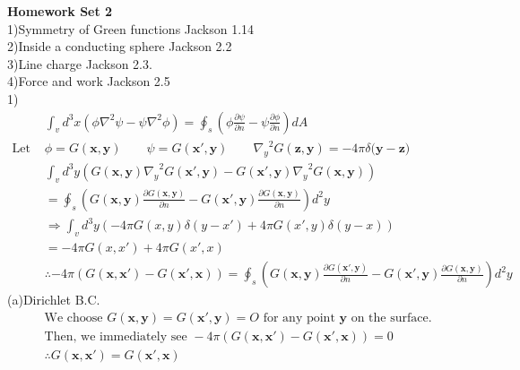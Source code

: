 \documentclass[letterpage]{article}
\begin{document}
  \textbf{Homework Set 2}\\

1)Symmetry of Green functions
Jackson 1.14\\

2)Inside a conducting sphere
Jackson 2.2\\

3)Line charge
Jackson 2.3.\\

4)Force and work
Jackson 2.5\\

1)
\begin{align*}
  &\int_v d^3 x (\phi \nabla^2 \psi-\psi \nabla^2 \phi) = \oint_s 
  \left(\phi \frac{\partial \psi}{\partial n}-\psi 
  \frac{\partial \phi}{\partial n} \right) dA\\
  \text{Let } &\phi = G(\textbf{x}, \textbf{y}) \qquad 
  \psi = G(\textbf{x}',\textbf{y}) \qquad {\nabla_y}^2 G(\textbf{z},\textbf{y})
  = -4\pi\delta (\textbf{y}-\textbf{z)}\\
  &\int_v d^3y \left(G(\textbf{x},\textbf{y}) {\nabla_y}^2 
  G (\textbf{x}',\textbf{y})
  - G(\textbf{x}',\textbf{y}){\nabla_y}^2 G(\textbf{x},\textbf{y})\right)\\
  &= \oint_s \left(G(\textbf{x},\textbf{y}) 
  \frac{\partial G (\textbf{x},\textbf{y})}{\partial n} 
  - G (\textbf{x}',\textbf{y})
  \frac{\partial G (\textbf{x},\textbf{y})}{\partial n} \right)d^2y\\
  &\Rightarrow \int_v d^3y \left(-4\pi G(x,y) \delta (y-x')
  + 4\pi G(x',y) \delta (y-x)\right)\\
  &= -4\pi G(x,x') + 4\pi G(x',x)\\
  &\therefore -4\pi \left(G(\textbf{x},\textbf{x}')
  -G(\textbf{x}',\textbf{x})\right)
  = \oint_s \left(G (\textbf{x},\textbf{y}) 
  \frac{\partial G (\textbf{x}',\textbf{y})}{\partial n}
  - G (\textbf{x}',\textbf{y}) 
  \frac{\partial G (\textbf{x},\textbf{y})}{\partial n}\right)d^2y
\end{align*}
\noindent
(a)Dirichlet B.C.\\
\begin{align*}
  &\text{We choose }G(\textbf{x},\textbf{y}) = G (\textbf{x}', \textbf{y})=O
  \text{ for any point }\textbf{y} \text{ on the surface.}\\
  &\text{Then, we immediately see } -4\pi \left(G(\textbf{x},\textbf{x}')
  - G(\textbf{x}',\textbf{x})\right)=0\\
  &\therefore G(\textbf{x},\textbf{x}') = G(\textbf{x}',\textbf{x})
\end{align*}
\end{document}
